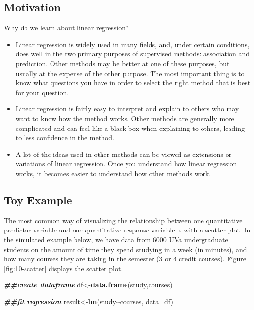 \documentclass[
]{book}
\newenvironment{Shaded}{\begin{snugshade}}{\end{snugshade}}
\newcommand{\AttributeTok}[1]{\textcolor[rgb]{0.13,0.29,0.53}{#1}}
\newcommand{\DocumentationTok}[1]{\textcolor[rgb]{0.56,0.35,0.01}{\textbf{\textit{#1}}}}
\newcommand{\FunctionTok}[1]{\textcolor[rgb]{0.13,0.29,0.53}{\textbf{#1}}}
\newcommand{\NormalTok}[1]{#1}
\newcommand{\OtherTok}[1]{\textcolor[rgb]{0.56,0.35,0.01}{#1}}
\newcommand{\SpecialCharTok}[1]{\textcolor[rgb]{0.81,0.36,0.00}{\textbf{#1}}}
\begin{document}
\hypertarget{motivation}{%
\subsection{Motivation}\label{motivation}}

Why do we learn about linear regression?

\begin{itemize}
\item
  Linear regression is widely used in many fields, and, under certain conditions, does well in the two primary purposes of supervised methods: association and prediction. Other methods may be better at one of these purposes, but usually at the expense of the other purpose. The most important thing is to know what questions you have in order to select the right method that is best for your question.
\item
  Linear regression is fairly easy to interpret and explain to others who may want to know how the method works. Other methods are generally more complicated and can feel like a black-box when explaining to others, leading to less confidence in the method.
\item
  A lot of the ideas used in other methods can be viewed as extensions or variations of linear regression. Once you understand how linear regression works, it becomes easier to understand how other methods work.
\end{itemize}

\hypertarget{toy-example}{%
\subsection{Toy Example}\label{toy-example}}

The most common way of visualizing the relationship between one quantitative predictor variable and one quantitative response variable is with a scatter plot. In the simulated example below, we have data from 6000 UVa undergraduate students on the amount of time they spend studying in a week (in minutes), and how many courses they are taking in the semester (3 or 4 credit courses). Figure \ref{fig:10-scatter} displays the scatter plot.

\begin{Shaded}
\begin{Highlighting}[]
\DocumentationTok{\#\#create dataframe}
\NormalTok{df}\OtherTok{\textless{}{-}}\FunctionTok{data.frame}\NormalTok{(study,courses)}

\DocumentationTok{\#\#fit regression}
\NormalTok{result}\OtherTok{\textless{}{-}}\FunctionTok{lm}\NormalTok{(study}\SpecialCharTok{\textasciitilde{}}\NormalTok{courses, }\AttributeTok{data=}\NormalTok{df)}
\end{Highlighting}
\end{Shaded}
\end{document}
